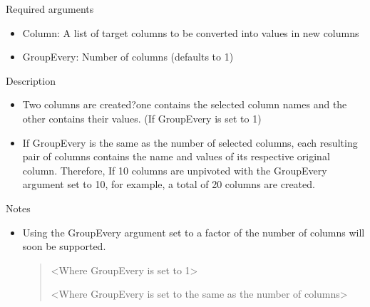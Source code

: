 \documentclass[letterpaper,10pt,english]{sphinxmanual}
\begin{document}
Required arguments
\begin{itemize}
\item {} 
Column: A list of target columns to be converted into values in new columns

\item {} 
GroupEvery: Number of columns (defaults to 1)

\end{itemize}

Description
\begin{itemize}
\item {} 
Two columns are created?one contains the selected column names and the other contains their values. (If GroupEvery is set to 1)

\item {} 
If GroupEvery is the same as the number of selected columns, each resulting pair of columns contains the name and values of its respective original column. Therefore, If 10 columns are unpivoted with the GroupEvery argument set to 10, for example, a total of 20 columns are created.

\end{itemize}

Notes
\begin{itemize}
\item {} 
Using the GroupEvery argument set to a factor of the number of columns will soon be supported.
\begin{quote}

\textless{}Where GroupEvery is set to 1\textgreater{}
\begin{quote}

\begin{figure}[H]
\centering

\noindent{}
\end{figure}
\end{quote}

\textless{}Where GroupEvery is set to the same as the number of columns\textgreater{}
\begin{quote}

\begin{figure}[H]
\centering

\noindent{}
\end{figure}
\end{quote}
\end{quote}

\end{itemize}
\end{document}
